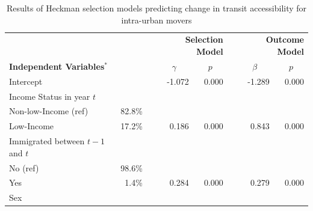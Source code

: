 \begin{table}[H]
	\renewcommand{\baselinestretch}{1.1} 
	\small
	\centering
	\caption{{Results of Heckman selection models predicting change in transit accessibility for intra-urban movers}}
	\label{table:models}
	
	\begin{tabular}{lrrrrrrr}
		\hline
		&         &  & \multicolumn{2}{r}{\textbf{Selection Model}}              &                      & \multicolumn{2}{r}{\textbf{Outcome Model}}                \\
		\textbf{Independent Variables$^*$}   &  &  & \multicolumn{1}{c}{$\gamma$} & \multicolumn{1}{c}{$p$} & \multicolumn{1}{c}{} & \multicolumn{1}{c}{$\beta$} & \multicolumn{1}{c}{$p$} \\ \hline
		Intercept                               &         &  & -1.072                   & 0.000                 &                      & -1.289                   & 0.000                 \\
		Income Status in year $t$                   &         &  &                          &                       &                      &                          &                       \\
		\hspace{2mm} Non-low-Income (ref)                         & 82.8\%  &  &                          &                       &                      &                          &                       \\
		\hspace{2mm} Low-Income                                & 17.2\%  &  & 0.186                    & 0.000                 &                      & 0.843                    & 0.000                 \\
		Immigrated between $t - 1$ and $t$             &         &  &                          &                       &                      &                          &                       \\
		\hspace{2mm} No (ref)                                  & 98.6\%  &  &                          &                       &                      &                          &                       \\
		\hspace{2mm} Yes                                       & 1.4\%   &  & 0.284                    & 0.000                 &                      & 0.279                    & 0.000                 \\
		Sex                                       &         &  &                          &                       &                      &                          &                       \\

\end{tabular}
\end{table}
